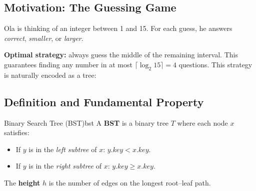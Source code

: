 \subsection{Motivation: The Guessing Game}

Ola is thinking of an integer between 1 and 15. For each guess, he answers
\emph{correct}, \emph{smaller}, or \emph{larger}.

\textbf{Optimal strategy:} always guess the middle of the remaining interval.
This guarantees finding any number in at most $\lceil\log_2 15\rceil = 4$
questions. This strategy is naturally encoded as a tree:

\begin{center}
\end{center}

\subsection{Definition and Fundamental Property}

\begin{definition}{Binary Search Tree (BST)}{bst}
A \textbf{BST} is a binary tree $T$ where each node $x$ satisfies:
\begin{itemize}[noitemsep]
  \item If $y$ is in the \emph{left subtree} of $x$:
        $y.\mathit{key} < x.\mathit{key}$.
  \item If $y$ is in the \emph{right subtree} of $x$:
        $y.\mathit{key} \ge x.\mathit{key}$.
\end{itemize}
The \textbf{height} $h$ is the number of edges on the longest root–leaf path.
\end{definition}

